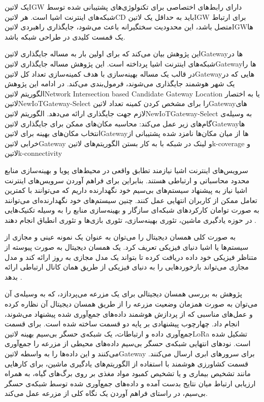 یک ‌لاتین{IGW} دارای رابط‌های اختصاصی برای تکنولوژی‌های پشتیبانی شده توسط شبکه‌های اینترنت اشیا است.
هر ‌لاتین{CD} باید به حداقل یک ‌لاتین{IGW} برای ارتباط متصل باشد، این محدودیت سختگیرانه باعث می‌شود، جایگذاری راهبردی ‌لاتین{IGW}ها یک قمست کلیدی
در طراحی شبکه باشد.

این پژوهش بیان می‌کند که برای اولین بار به مساله جایگذاری ‌لاتین{Gateway}ها در شبکه‌های اینترنت اشیا پرداخته است.
این پژوهش مساله جایگذاری ‌لاتین{Gateway}ها را در قالب یک مساله بهینه‌سازی با هدف کمینه‌سازی تعداد کل ‌لاتین{Gateway}هایی که در یک شهر هوشمند
جایگذاری می‌شوند، فرمول‌بندی می‌کند.
در ادامه این پژوهش الگوریتم ‌لاتین{Network Intersection based Candidate Gateway Location}
یا به اختصار ‌لاتین{NewIoTGateway-Select} را برای مشخص کردن کمینه تعداد ‌لاتین{Gateway}های لازم جهت جایگذاری ارائه می‌دهد.
الگوریتم ‌لاتین{NewIoTGateway-Select} به وسیله‌ی گام‌های زیر عمل می‌کند:
 محاسبه مکان‌های ممکن برای جایگذاری ‌لاتین{Gateway}ها
 انتخاب مکان‌های بهینه برای ‌لاتین{Gateway}ها از میان مکان‌ها نامزد شده
 پشتیبانی از خرابی ‌لاتین{Gateway} و لینک در شبکه با به کار بستن الگوریتم‌های ‌لاتین{k-coverage} و ‌لاتین{k-connectivity}


سرویس‌های اینترنت اشیا نیازمند تطابق واقعی در محیط‌های پویا و بهینه‌سازی منابع محدود محاسباتی و ارتباطی هستند.
بنابراین برای فراهم آوردن سرویس‌های اینترنت اشیا نیاز به پیشنهاد سیستم‌های بی‌سیم خود نگهدارنده داریم که می‌توانند با کمترین
تعامل ممکن از کاربران انتهایی عمل کنند. چنین سیستم‌های خود نگهدارنده‌ای می‌توانند به صورت توامان کارکردهای شبکه‌ای سازگار و
بهینه‌سازی منابع را به وسیله تکنیک‌هایی در حوزه یادگیری ماشین، تئوری بهینه‌سازی، تئوری بازی‌ها و تئوری انطباق انجام دهند
.

به صورت کلی همسان دیجیتال را می‌توان به عنوان یک نمونه عینی و مجازی از سیستم‌ها یا اشیا دنیای فیزیکی تعریف کرد.
یک همسان دیجیتال به صورت پیوسته از متناظر فیزیکی خود داده دریافت کرده تا بتواند یک مدل مجازی به روز ارائه کند و مدل مجازی
می‌تواند بازخوردهایی را به دنیای فیزیکی از طریق همان کانال ارتباطی ارائه بدهد
.


پژوهش  به بررسی همسان دیجیتالی برای یک مزرعه می‌پردازد، که به وسیله‌ی آن می‌توان به صورت همزمان وضعیت مزرعه را از طریق
همسان دیجیتال آن نظاره کرده و عمل‌های مناسبی که از پردازش هوشمند داده‌های جمع‌آوری شده پیشنهاد می‌شوند، انجام داد.
چهارچوب پیشنهادی بر پایه دو قسمت ساخته شده است. برای قسمت جمع‌آوری داده و ارتباطات، یک شبکه‌ی حسگر بی‌سیم بهینه ‌لاتین{LoRa} تشکیل شده است.
نودهای انتهایی شبکه‌ی حسگر بی‌سیم داده‌های محیطی از مزرعه را جمع‌آوری می‌کنند و این داده‌ها را به واسطه ‌لاتین{Gateway} برای سرورهای ابری ارسال می‌کنند.
قسمت کشاورزی هوشمند با استفاده از الگوریتم‌های یادگیری ماشین، برای کارهایی مانند تشخیص بیماری و یا تشخیص کمبود مواد مغذی بر روی برگ‌های گیاه،
به همراه ارزیابی ارتباط میان نتایج بدست آمده و داده‌های جمع‌آوری شده توسط شبکه‌ی حسگر بی‌سیم، در راستای فراهم آوردن یک نگاه کلی از مزرعه عمل می‌کند.


